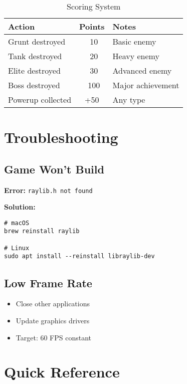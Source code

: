 \documentclass[11pt,a4paper]{article}
\begin{document}
\begin{table}[h]
\centering
\begin{tabularx}{\textwidth}{|l|c|X|}
\hline
\rowcolor{primarycolor!20}
\textbf{Action} & \textbf{Points} & \textbf{Notes} \\
\hline
Grunt destroyed & ~10 & Basic enemy \\
\hline
Tank destroyed & ~20 & Heavy enemy \\
\hline
Elite destroyed & ~30 & Advanced enemy \\
\hline
Boss destroyed & ~100 & Major achievement \\
\hline
Powerup collected & +50 & Any type \\
\hline
\end{tabularx}
\caption{Scoring System}
\end{table}

\section{Troubleshooting}

\subsection{Game Won't Build}

\textbf{Error:} \texttt{raylib.h not found}

\textbf{Solution:}
\begin{verbatim}
# macOS
brew reinstall raylib

# Linux
sudo apt install --reinstall libraylib-dev
\end{verbatim}

\subsection{Low Frame Rate}

\begin{itemize}
    \item Close other applications
    \item Update graphics drivers
    \item Target: 60 FPS constant
\end{itemize}

\section{Quick Reference}
\end{document}

